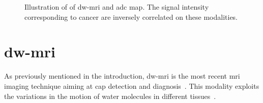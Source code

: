 \begin{figure}
\centering
	\hspace*{\fill}
	 \hfill
	\hspace*{\fill}
	\caption[Example of \acs*{dw}-\acs*{mri} and \acs*{dce} map.]{Illustration of of \acs*{dw}-\acs*{mri} and \acs*{adc} map. The signal intensity corresponding to cancer are inversely correlated on these modalities.}
	\label{fig:dwi}
\end{figure}

\section{\acs*{dw}-\acs*{mri}}\label{subsec:chp2:imaging:dw}
As previously mentioned in the introduction, \ac{dw}-\ac{mri} is the most recent \ac{mri} imaging technique aiming at \ac{cap} detection and diagnosis~\cite{Scheidler1999}.
This modality exploits the variations in the motion of water molecules in different tissues~\cite{LeBihan1988,Koh2007}.


